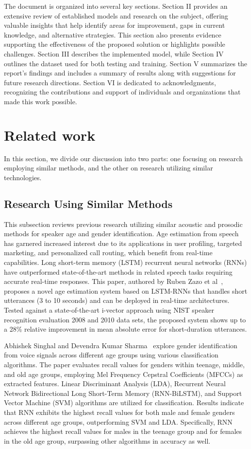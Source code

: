 \documentclass[conference, 10pt,onecolumn]{IEEEtran}
\begin{document}
The document is organized into several key sections. Section II provides an extensive review of established models and research on the subject, offering valuable insights that help identify areas for improvement, gaps in current knowledge, and alternative strategies. This section also presents evidence supporting the effectiveness of the proposed solution or highlights possible challenges. Section III describes the implemented model, while Section IV outlines the dataset used for both testing and training. Section V summarizes the report's findings and includes a summary of results along with suggestions for future research directions. Section VI is dedicated to acknowledgments, recognizing the contributions and support of individuals and organizations that made this work possible.

\section{Related work}
In this section, we divide our discussion into two parts: one focusing on research employing similar methods, and the other on research utilizing similar technologies.
\subsection{Research Using Similar Methods}
This subsection reviews previous research utilizing similar acoustic and prosodic methods for speaker age and gender identification. Age estimation from speech has garnered increased interest due to its applications in user profiling, targeted marketing, and personalized call routing, which benefit from real-time capabilities. Long short-term memory (LSTM) recurrent neural networks (RNNs) have outperformed state-of-the-art methods in related speech tasks requiring accurate real-time responses. This paper, authored by Ruben Zazo et al~\cite{zazo2018age}, proposes a novel age estimation system based on LSTM-RNNs that handles short utterances (3 to 10 seconds) and can be deployed in real-time architectures. Tested against a state-of-the-art i-vector approach using NIST speaker recognition evaluation 2008 and 2010 data sets, the proposed system shows up to a 28\% relative improvement in mean absolute error for short-duration utterances.

Abhishek Singhal and Devendra Kumar Sharma~\cite{abdi2010principal} explore gender identification from voice signals across different age groups using various classification algorithms. The paper evaluates recall values for genders within teenage, middle, and old age groups, employing Mel Frequency Cepstral Coefficients (MFCCs) as extracted features. Linear Discriminant Analysis (LDA), Recurrent Neural Network Bidirectional Long Short-Term Memory (RNN-BiLSTM), and Support Vector Machine (SVM) algorithms are utilized for classification. Results indicate that RNN exhibits the highest recall values for both male and female genders across different age groups, outperforming SVM and LDA. Specifically, RNN achieves the highest recall values for males in the teenage group and for females in the old age group, surpassing other algorithms in accuracy as well.
\end{document}
